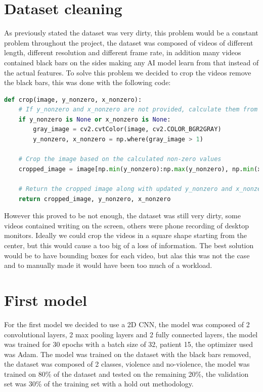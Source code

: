 \section{Dataset cleaning}
As previously stated the dataset was very dirty, this problem would be a constant problem throughout the project, the dataset was composed of videos of different length, different resolution and different frame rate, in addition many videos contained black bars on the sides making any AI model learn from that instead of the actual features. To solve this problem we decided to crop the videos remove the black bars, this was done with the following code:

\begin{lstlisting}[language=Python, caption={Image Cropper}, label={lst:ImageCropper}]
    def crop(image, y_nonzero, x_nonzero):
    # If y_nonzero and x_nonzero are not provided, calculate them from the grayscale version of the image
    if y_nonzero is None or x_nonzero is None:
        gray_image = cv2.cvtColor(image, cv2.COLOR_BGR2GRAY)
        y_nonzero, x_nonzero = np.where(gray_image > 1)

    # Crop the image based on the calculated non-zero values
    cropped_image = image[np.min(y_nonzero):np.max(y_nonzero), np.min(x_nonzero):np.max(x_nonzero)]

    # Return the cropped image along with updated y_nonzero and x_nonzero values
    return cropped_image, y_nonzero, x_nonzero
\end{lstlisting}

However this proved to be not enough, the dataset was still very dirty, some videos contained writing on the screen, others were phone recording of desktop monitors. Ideally we could crop the videos in a square shape starting from the center, but this would cause a too big of a loss of information. The best solution would be to have bounding boxes for each video, but alas this was not the case and to manually made it would have been too much of a workload.

\section{First model}
For the first model we decided to use a 2D CNN, the model was composed of 2 convolutional layers, 2 max pooling layers and 2 fully connected layers, the model was trained for 30 epochs with a batch size of 32, patient 15, the optimizer used was Adam. The model was trained on the dataset with the black bars removed, the dataset was composed of 2 classes, violence and no-violence, the model was trained on 80\% of the dataset and tested on the remaining 20\%, the validation set was 30\% of the training set with a hold out methodology.  

